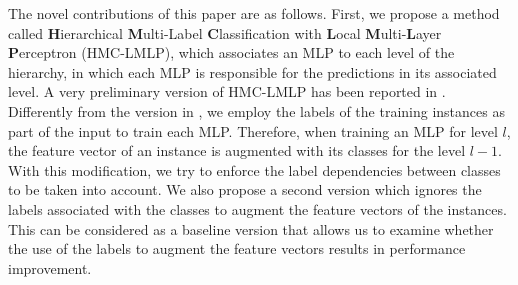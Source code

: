 

The novel contributions of this paper are as follows. First, we propose a method called {\bf H}ierarchical {\bf M}ulti-Label {\bf C}lassification with {\bf L}ocal {\bf M}ulti-{\bf L}ayer {\bf P}erceptron (HMC-LMLP), which associates an MLP to each level of the hierarchy, in which each MLP is responsible for the predictions in its associated level. A very preliminary version of HMC-LMLP has been reported in \cite{Cerri2013}. Differently from the version in \cite{Cerri2013}, we employ the labels of the training instances as part of the input to train each MLP. Therefore, when training an MLP for level $l$, the feature vector of an instance is augmented with its classes for the level $l-1$. With this modification, we try to enforce the label dependencies between classes to be taken into account. We also propose a second version which ignores the labels associated with the classes to augment the feature vectors of the instances. This can be considered as a baseline version that allows us to examine whether the use of the labels to augment the feature vectors results in performance improvement.

